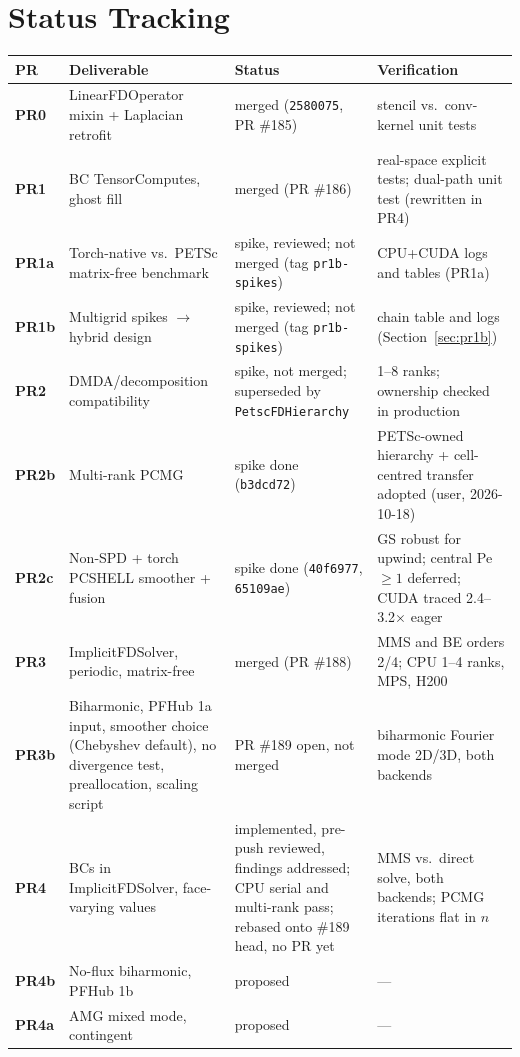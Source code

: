 \documentclass[11pt]{article}
\begin{document}
\section{Status Tracking}

\begin{longtable}{>{\bfseries}p{} p{} p{} p{}}
\toprule
PR & Deliverable & Status & Verification \\
\midrule
\endhead
PR0 & LinearFDOperator mixin + Laplacian retrofit & merged (\texttt{2580075}, PR \#185) & stencil vs.\ conv-kernel unit tests \\
PR1 & BC TensorComputes, ghost fill & merged (PR \#186) & real-space explicit tests; dual-path unit test (rewritten in PR4) \\
PR1a & Torch-native vs.\ PETSc matrix-free benchmark & spike, reviewed; not merged (tag \texttt{pr1b-spikes}) & CPU+CUDA logs and tables (PR1a) \\
PR1b & Multigrid spikes $\to$ hybrid design & spike, reviewed; not merged (tag \texttt{pr1b-spikes}) & chain table and logs (Section~\ref{sec:pr1b}) \\
PR2 & DMDA/decomposition compatibility & spike, not merged; superseded by \texttt{PetscFDHierarchy} & 1--8 ranks; ownership checked in production \\
PR2b & Multi-rank PCMG & spike done (\texttt{b3dcd72}) & PETSc-owned hierarchy + cell-centred transfer adopted (user, 2026-10-18) \\
PR2c & Non-SPD + torch PCSHELL smoother + fusion & spike done (\texttt{40f6977}, \texttt{65109ae}) & GS robust for upwind; central Pe $\ge1$ deferred; CUDA traced 2.4--3.2$\times$ eager \\
PR3 & ImplicitFDSolver, periodic, matrix-free & merged (PR \#188) & MMS and BE orders 2/4; CPU 1--4 ranks, MPS, H200 \\
PR3b & Biharmonic, PFHub 1a input, smoother choice (Chebyshev default), no divergence test, preallocation, scaling script & PR \#189 open, not merged & biharmonic Fourier mode 2D/3D, both backends \\
PR4 & BCs in ImplicitFDSolver, face-varying values & implemented, pre-push reviewed, findings addressed; CPU serial and multi-rank pass; rebased onto \#189 head, no PR yet & MMS vs.\ direct solve, both backends; PCMG iterations flat in $n$ \\
PR4b & No-flux biharmonic, PFHub 1b & proposed & --- \\
PR4a & AMG mixed mode, contingent & proposed & --- \\

\end{longtable}
\end{document}
